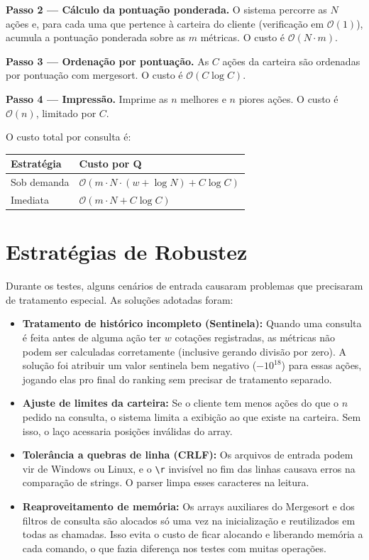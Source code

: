 \documentclass[12pt,a4paper]{article}
\begin{document}
\textbf{Passo 2 --- Cálculo da pontuação ponderada.} O sistema percorre as $N$ ações e, para cada uma que pertence à carteira do cliente (verificação em $\mathcal{O}(1)$), acumula a pontuação ponderada sobre as $m$ métricas. O custo é $\mathcal{O}(N \cdot m)$.

\textbf{Passo 3 --- Ordenação por pontuação.} As $C$ ações da carteira são ordenadas por pontuação com mergesort. O custo é $\mathcal{O}(C \log C)$.

\textbf{Passo 4 --- Impressão.} Imprime as $n$ melhores e $n$ piores ações. O custo é $\mathcal{O}(n)$, limitado por $C$.

O custo total por consulta é:

\begin{table}[h]
\centering
\begin{tabular}{|l|l|}
\hline
\textbf{Estratégia} & \textbf{Custo por Q} \\ \hline
Sob demanda & $\mathcal{O}(m \cdot N \cdot (w + \log N) + C \log C)$ \\ \hline
Imediata & $\mathcal{O}(m \cdot N + C \log C)$ \\ \hline
\end{tabular}
\end{table}

\section{Estratégias de Robustez}

Durante os testes, alguns cenários de entrada causaram problemas que precisaram de tratamento especial. As soluções adotadas foram:

\begin{itemize}
    \item \textbf{Tratamento de histórico incompleto (Sentinela):} Quando uma consulta é feita antes de alguma ação ter $w$ cotações registradas, as métricas não podem ser calculadas corretamente (inclusive gerando divisão por zero). A solução foi atribuir um valor sentinela bem negativo ($-10^{18}$) para essas ações, jogando elas pro final do ranking sem precisar de tratamento separado.

    \item \textbf{Ajuste de limites da carteira:} Se o cliente tem menos ações do que o $n$ pedido na consulta, o sistema limita a exibição ao que existe na carteira. Sem isso, o laço acessaria posições inválidas do array.

    \item \textbf{Tolerância a quebras de linha (CRLF):} Os arquivos de entrada podem vir de Windows ou Linux, e o \verb|\r| invisível no fim das linhas causava erros na comparação de strings. O parser limpa esses caracteres na leitura.

    \item \textbf{Reaproveitamento de memória:} Os arrays auxiliares do Mergesort e dos filtros de consulta são alocados só uma vez na inicialização e reutilizados em todas as chamadas. Isso evita o custo de ficar alocando e liberando memória a cada comando, o que fazia diferença nos testes com muitas operações.
\end{itemize}
\end{document}
